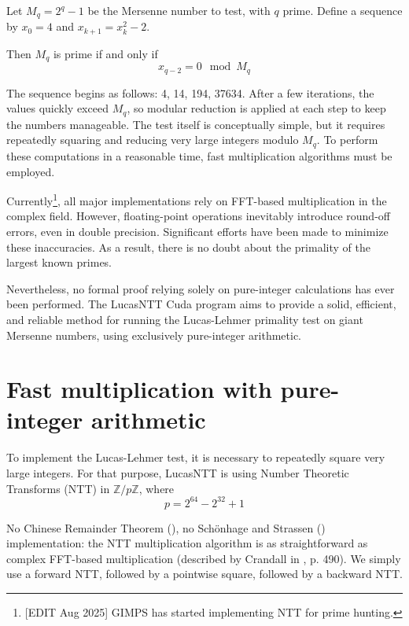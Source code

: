 \documentclass{article}
\begin{document}
Let $M_q = 2^q-1$ be the Mersenne number to test, with $q$ prime. Define a sequence by $x_0 = 4$ and $x_{k+1} = x_k^2 -2$. 

Then $M_q$ is prime if and only if 
\begin{equation*}
    x_{q-2} = 0 \mod M_q
\end{equation*}

The sequence begins as follows: 4, 14, 194, 37634. After a few iterations, the values quickly exceed $M_q$, so modular reduction is applied at each step to keep the numbers manageable. The test itself is conceptually simple, but it requires repeatedly squaring and reducing very large integers modulo $M_q$. To perform these computations in a reasonable time, fast multiplication algorithms must be employed.

Currently\footnote{[EDIT Aug 2025] GIMPS has started implementing NTT for prime hunting.}, all major implementations rely on FFT-based multiplication in the complex field. However, floating-point operations inevitably introduce round-off errors, even in double precision. Significant efforts have been made to minimize these inaccuracies. As a result, there is no doubt about the primality of the largest known primes.

Nevertheless, no formal proof relying solely on pure-integer calculations has ever been performed. The LucasNTT Cuda program aims to provide a solid, efficient, and reliable method for running the Lucas-Lehmer primality test on giant Mersenne numbers, using exclusively pure-integer arithmetic.

\newpage
\section{Fast multiplication with pure-integer arithmetic}
To implement the Lucas-Lehmer test, it is necessary to repeatedly square very large integers. For that purpose, LucasNTT is using Number Theoretic Transforms (NTT) in $\mathbb{Z}/p\mathbb{Z}$, where
 \begin{equation*}
    p = 2^{64} - 2^{32} + 1
\end{equation*}

No Chinese Remainder Theorem (\cite{Pol71}), no Schönhage and Strassen (\cite{SS70}) implementation: the NTT multiplication algorithm is as straightforward as complex FFT-based multiplication (described by Crandall  in \cite{CP05}, p. 490). We simply use a forward NTT, followed by a pointwise square, followed by a backward NTT.
\end{document}
